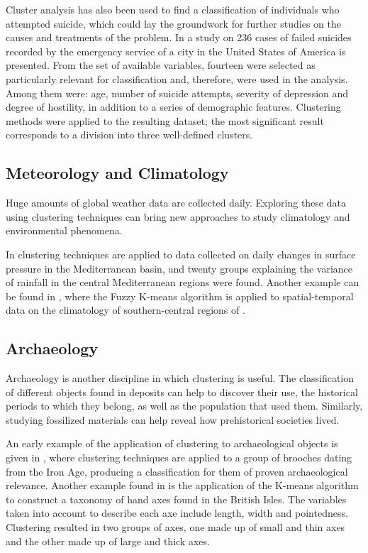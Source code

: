 Cluster analysis has also been used to find a classification of individuals who attempted suicide, which could lay the groundwork for further studies on the causes and treatments of the problem. In \cite{paykel1978classification} a study on 236 cases of failed suicides recorded by the emergency service of a city in the United States of America is presented. From the set of available variables, fourteen were selected as particularly relevant for classification and, therefore, were used in the analysis. Among them were: age, number of suicide attempts, severity of depression and degree of hostility, in addition to a series of demographic features. Clustering methods were applied to the resulting dataset; the most significant result corresponds to a division into three well-defined clusters.

\subsection{Meteorology and Climatology}

Huge amounts of global weather data are collected daily. Exploring these data using clustering techniques can bring new approaches to study climatology and environmental phenomena.

In \cite{littmann2000empirical} clustering techniques are applied to data collected on daily changes in surface pressure in the Mediterranean basin, and twenty groups explaining the variance of rainfall in the central Mediterranean regions were found. Another example can be found in \cite{liu2005mining}, where the Fuzzy K-means algorithm is applied to spatial-temporal data on the climatology of southern-central regions of . 

\subsection{Archaeology}

Archaeology is another discipline in which clustering is useful. The classification of different objects found in deposits can help to discover their use, the historical periods to which they belong, as well as the population that used them. Similarly, studying fossilized materials can help reveal how prehistorical societies lived. 

An early example of the application of clustering to archaeological objects is given in \cite{hodson1966some}, where clustering techniques are applied to a group of brooches dating from the Iron Age, producing a classification for them of proven archaeological relevance. Another example found in \cite{hodson1971numerical} is the application of the K-means algorithm to construct a taxonomy of hand axes found in the British Isles. The variables taken into account to describe each axe include length, width and pointedness. Clustering resulted in two groups of axes, one made up of small and thin axes and the other made up of large and thick axes.

